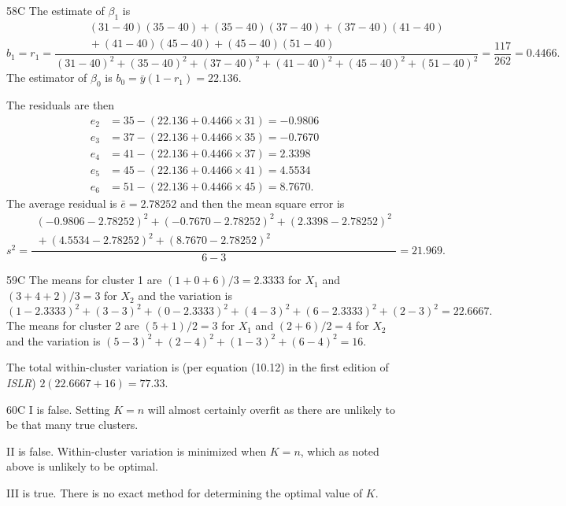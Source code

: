 \begin{solution}{58}{C}
The estimate of $\beta_1$ is
\[ b_1 = r_1 = \dfrac{\begin{array}{c}(31-40)(35-40) + (35-40)(37-40) + (37-40)(41-40) \\ {}+ (41-40)(45-40) + (45-40)(51-40)\end{array}}{(31-40)^2 + (35-40)^2 + (37-40)^2 + (41-40)^2 + (45-40)^2 + (51-40)^2} = \dfrac{117}{262} = 0.4466. \]
The estimator of $\beta_0$ is $b_0 = \bar{y}(1 - r_1) = 22.136$.

The residuals are then
\begin{align*}
e_2 &= 35 - (22.136 + 0.4466 \times 31) = -0.9806 \\
e_3 &= 37 - (22.136 + 0.4466 \times 35) = -0.7670 \\
e_4 &= 41 - (22.136 + 0.4466 \times 37) = 2.3398 \\
e_5 &= 45 - (22.136 + 0.4466 \times 41) = 4.5534 \\
e_6 &= 51 - (22.136 + 0.4466 \times 45) = 8.7670.
\end{align*}
The average residual is $\bar{e} = 2.78252$ and then the mean square error is
\[ s^2 = \dfrac{\begin{array}{c}(-0.9806 - 2.78252)^2 + (-0.7670 - 2.78252)^2 + (2.3398 - 2.78252)^2 \\ {}+ (4.5534 - 2.78252)^2 + (8.7670 - 2.78252)^2\end{array}}{6 - 3} = 21.969. \]
\end{solution}

\begin{solution}{59}{C}
The means for cluster 1 are $(1 + 0 + 6)/3 = 2.3333$ for $X_1$ and $(3 + 4 + 2)/3 = 3$ for $X_2$ and the variation is
\[ (1 - 2.3333)^2 + (3 - 3)^2 + (0 - 2.3333)^2 + (4 - 3)^2 + (6 - 2.3333)^2 + (2 - 3)^2 = 22.6667. \]
The means for cluster 2 are $(5 + 1)/2 = 3$ for $X_1$ and $(2 + 6)/2 = 4$ for $X_2$ and the variation is $(5 - 3)^2 + (2 - 4)^2 + (1 - 3)^2 + (6 - 4)^2 = 16$.

The total within-cluster variation is (per equation (10.12) in the first edition of \textit{ISLR}) $2(22.6667 + 16) = 77.33$.
\end{solution}

\begin{solution}{60}{C}
I is false. Setting $K = n$ will almost certainly overfit as there are unlikely to be that many true clusters.

II is false. Within-cluster variation is minimized when $K = n$, which as noted above is unlikely to be optimal.

III is true. There is no exact method for determining the optimal value of $K$.
\end{solution}

